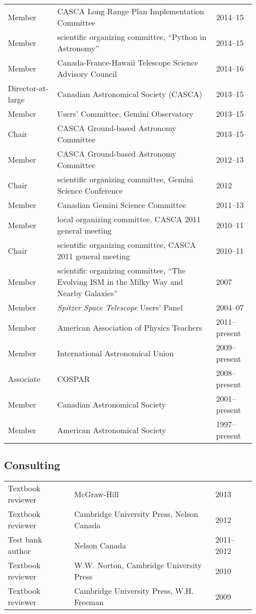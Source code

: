 \documentclass[12pt]{article}
\begin{document}
\vspace{0.5cm}
\begin{tabular}{lp{12cm}l}
Member& CASCA Long Range Plan Implementation Committee& 2014--15\\
Member& scientific organizing committee, ``Python in Astronomy'' & 2014--15\\
Member& Canada-France-Hawaii Telescope Science Advisory Council& 2014--16\\
Director-at-large& Canadian Astronomical Society (CASCA)& 2013--15\\
Member&  Users' Committee, Gemini Observatory& 2013--15\\
Chair& CASCA Ground-based Astronomy Committee& 2013--15\\
Member& CASCA Ground-based Astronomy Committee& 2012--13\\
Chair& scientific organizing committee, Gemini Science Conference& 2012\\
Member& Canadian Gemini Science Committee& 2011--13\\
Member& local organizing committee, CASCA 2011 general meeting&2010--11\\
Chair& scientific organizing committee, CASCA 2011 general meeting&2010--11\\
Member& scientific organizing committee, ``The Evolving ISM in the Milky Way and Nearby Galaxies'' & 2007\\
Member& {\it Spitzer Space Telescope} Users' Panel& 2004--07\\
Member& American Association of Physics Teachers& 2011--present\\
Member& International Astronomical Union& 2009--present\\
Associate& COSPAR& 2008--present\\
Member& Canadian Astronomical Society& 2001--present\\
Member& American Astronomical Society& 1997--present
\end{tabular}

\subsection{Consulting}
\begin{tabular}{lll}
Textbook reviewer& McGraw-Hill& 2013\\
Textbook reviewer & Cambridge University Press, Nelson Canada&2012\\
Test bank author& Nelson Canada& 2011--2012\\
Textbook reviewer& W.W. Norton, Cambridge University Press& 2010\\
Textbook reviewer& Cambridge University Press, W.H. Freeman& 2009
\end{tabular}
\end{document}

